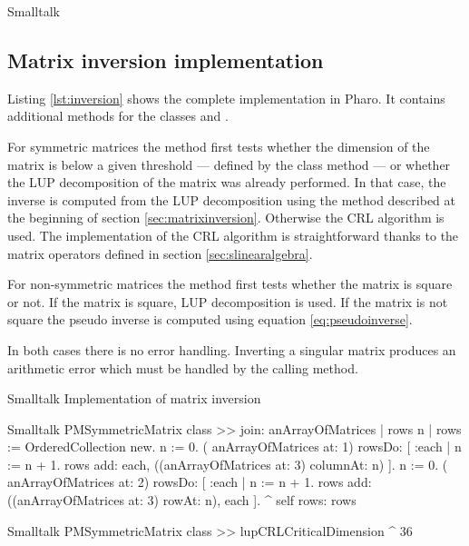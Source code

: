 \begin{displaycode}{Smalltalk}
\subsection{Matrix inversion implementation}
Listing \ref{lst:inversion} shows the complete implementation in
Pharo. It contains additional methods for the classes  and .

For symmetric matrices the method  first tests
whether the dimension of the matrix is below a given threshold ---
defined by the class method  --- or
whether the LUP decomposition of the matrix was already performed.
In that case, the inverse is computed from the LUP decomposition
using the method described at the beginning of section
\ref{sec:matrixinversion}. Otherwise the CRL algorithm is used.
The implementation of the CRL algorithm is straightforward thanks
to the matrix operators defined in section
\ref{sec:slinearalgebra}.

For non-symmetric matrices the method  first tests
whether the matrix is square or not. If the matrix is square, LUP
decomposition is used. If the matrix is not square the pseudo
inverse is computed using equation \ref{eq:pseudoinverse}.

In both cases there is no error handling. Inverting a singular
matrix produces an arithmetic error which must be handled by the
calling method.

\begin{listing}[label=lst:inversion]{Smalltalk}
{Implementation of matrix inversion}
\end{listing}

\begin{displaycode}{Smalltalk}
PMSymmetricMatrix class >> join: anArrayOfMatrices
    | rows n |
    rows := OrderedCollection new.
    n := 0.
    ( anArrayOfMatrices at: 1) rowsDo:
        [ :each |
          n := n + 1.
          rows add: each, ((anArrayOfMatrices at: 3) columnAt: n) ].
    n := 0.
    ( anArrayOfMatrices at: 2) rowsDo:
        [ :each |
          n := n + 1.
          rows add: ((anArrayOfMatrices at: 3) rowAt: n), each ].
    ^ self rows: rows 
\end{displaycode}

\begin{displaycode}{Smalltalk}
PMSymmetricMatrix class >> lupCRLCriticalDimension
    ^ 36
\end{displaycode}


\end{displaycode}
